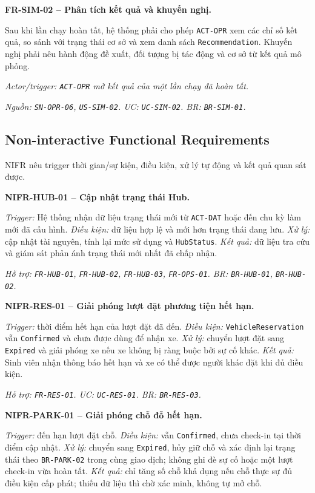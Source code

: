 \medskip
\noindent\textbf{FR-SIM-02 -- Phân tích kết quả và khuyến nghị.}\par
\nopagebreak[4]
Sau khi lần chạy hoàn tất, hệ thống phải cho phép \texttt{ACT-OPR} xem các chỉ số kết quả, so sánh với trạng thái cơ sở và xem danh sách \texttt{Recommendation}. Khuyến nghị phải nêu hành động đề xuất, đối tượng bị tác động và cơ sở từ kết quả mô phỏng.

\textit{Actor/trigger: \texttt{ACT-OPR} mở kết quả của một lần chạy đã hoàn tất.}\par
\textit{Nguồn: \texttt{SN-OPR-06}, \texttt{US-SIM-02}. UC: \texttt{UC-SIM-02}. BR: \texttt{BR-SIM-01}.}

\subsection{Non-interactive Functional Requirements}

NIFR nêu trigger thời gian/sự kiện, điều kiện, xử lý tự động và kết quả quan sát được.

\noindent\textbf{NIFR-HUB-01 -- Cập nhật trạng thái Hub.}\par
\nopagebreak[4]
\textit{Trigger:} Hệ thống nhận dữ liệu trạng thái mới từ \texttt{ACT-DAT} hoặc đến chu kỳ làm mới đã cấu hình. \textit{Điều kiện:} dữ liệu hợp lệ và mới hơn trạng thái đang lưu. \textit{Xử lý:} cập nhật tài nguyên, tính lại mức sử dụng và \texttt{HubStatus}. \textit{Kết quả:} dữ liệu tra cứu và giám sát phản ánh trạng thái mới nhất đã chấp nhận.

\textit{Hỗ trợ: \texttt{FR-HUB-01}, \texttt{FR-HUB-02}, \texttt{FR-HUB-03}, \texttt{FR-OPS-01}. BR: \texttt{BR-HUB-01}, \texttt{BR-HUB-02}.}

\medskip
\noindent\textbf{NIFR-RES-01 -- Giải phóng lượt đặt phương tiện hết hạn.}\par
\nopagebreak[4]
\textit{Trigger:} thời điểm hết hạn của lượt đặt đã đến. \textit{Điều kiện:} \texttt{VehicleReservation} vẫn \texttt{Confirmed} và chưa được dùng để nhận xe. \textit{Xử lý:} chuyển lượt đặt sang \texttt{Expired} và giải phóng xe nếu xe không bị ràng buộc bởi sự cố khác. \textit{Kết quả:} Sinh viên nhận thông báo hết hạn và xe có thể được người khác đặt khi đủ điều kiện.

\textit{Hỗ trợ: \texttt{FR-RES-01}. UC: \texttt{UC-RES-01}. BR: \texttt{BR-RES-03}.}

\medskip
\noindent\textbf{NIFR-PARK-01 -- Giải phóng chỗ đỗ hết hạn.}\par
\nopagebreak[4]
\textit{Trigger:} đến hạn lượt đặt chỗ. \textit{Điều kiện:} vẫn \texttt{Confirmed}, chưa check-in tại thời điểm cập nhật. \textit{Xử lý:} chuyển sang \texttt{Expired}, hủy giữ chỗ và xác định lại trạng thái theo \texttt{BR-PARK-02} trong cùng giao dịch; không ghi đè sự cố hoặc một lượt check-in vừa hoàn tất. \textit{Kết quả:} chỉ tăng số chỗ khả dụng nếu chỗ thực sự đủ điều kiện cấp phát; thiếu dữ liệu thì chờ xác minh, không tự mở chỗ.

